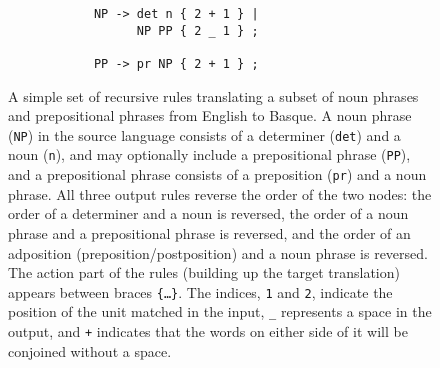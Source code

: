 \documentclass[free]{flammie}
\begin{document}
\begin{figure}
\begin{minipage}{\textwidth}
    \centering
    \begin{verbatim}
            NP -> det n { 2 + 1 } |
                  NP PP { 2 _ 1 } ;

            PP -> pr NP { 2 + 1 } ;
    \end{verbatim}
    \caption{A simple set of recursive rules translating a subset of noun
    phrases and prepositional phrases from English to Basque.  A noun phrase
    (\texttt{NP}) in the source language consists of a determiner (\texttt{det})
    and a noun (\texttt{n}), and may optionally include a prepositional phrase
    (\texttt{PP}), and a prepositional phrase consists of a preposition
    (\texttt{pr}) and a noun phrase.  All three output rules reverse the order
    of the two nodes: the order of a determiner and a noun is reversed, the
    order of a noun phrase and a prepositional phrase is reversed, and the order
    of an adposition (preposition/postposition) and a noun phrase is reversed.
    The action part of the rules (building up the target translation) appears
    between braces \texttt{\{\ldots\}}.  The indices, \texttt{1} and \texttt{2},
    indicate the position of the unit matched in the input, \texttt{\_}
    represents a space in the output, and \texttt{+} indicates that the words on
    either side of it will be conjoined without a space. }
    \label{fig:recursion}
\end{minipage}


\end{figure}
\end{document}
